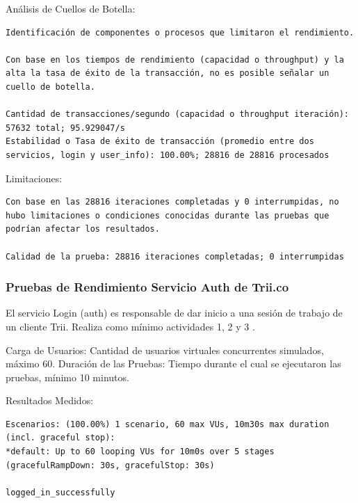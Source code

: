 \documentclass[
  paper=a4,
  ,captions=tableheading
]{scrartcl}
\begin{document}
Análisis de Cuellos de Botella:

\begin{verbatim}
Identificación de componentes o procesos que limitaron el rendimiento.

Con base en los tiempos de rendimiento (capacidad o throughput) y la alta la tasa de éxito de la transacción, no es posible señalar un cuello de botella.

Cantidad de transacciones/segundo (capacidad o throughput iteración): 57632 total; 95.929047/s
Estabilidad o Tasa de éxito de transacción (promedio entre dos servicios, login y user_info): 100.00%; 28816 de 28816 procesados
\end{verbatim}

Limitaciones:

\begin{verbatim}
Con base en las 28816 iteraciones completadas y 0 interrumpidas, no hubo limitaciones o condiciones conocidas durante las pruebas que podrían afectar los resultados.

Calidad de la prueba: 28816 iteraciones completadas; 0 interrumpidas
\end{verbatim}

\subsubsection{Pruebas de Rendimiento Servicio Auth de
Trii.co}\label{sec:pruebas-de-rendimiento-servicio-auth-de-trii.co}

El servicio Login (auth) es responsable de dar inicio a una sesión de
trabajo de un cliente Trii. Realiza como mínimo actividades 1, 2 y 3 .

Carga de Usuarios: Cantidad de usuarios virtuales concurrentes
simulados, máximo 60. Duración de las Pruebas: Tiempo durante el cual se
ejecutaron las pruebas, mínimo 10 minutos.

Resultados Medidos:

\begin{verbatim}
Escenarios: (100.00%) 1 scenario, 60 max VUs, 10m30s max duration (incl. graceful stop):
*default: Up to 60 looping VUs for 10m0s over 5 stages (gracefulRampDown: 30s, gracefulStop: 30s)

logged_in_successfully
\end{verbatim}
\end{document}
